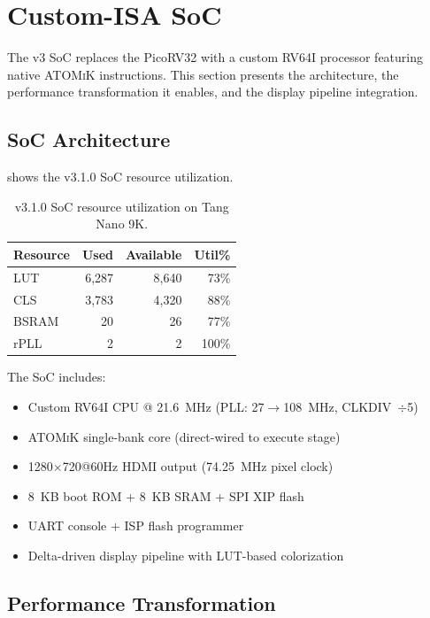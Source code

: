 \documentclass[11pt,letterpaper]{article}
\theoremstyle{plain}
\theoremstyle{definition}
\theoremstyle{remark}
\newcommand{\atomik}{\textsc{ATOMiK}}
\begin{document}
\section{Custom-ISA SoC}
\label{sec:v3}

The v3 SoC replaces the PicoRV32 with a custom RV64I processor featuring native \atomik{} instructions. This section presents the architecture, the performance transformation it enables, and the display pipeline integration.

\subsection{SoC Architecture}

 shows the v3.1.0 SoC resource utilization.

\begin{table}[!htbp]
\centering
\caption{v3.1.0 SoC resource utilization on Tang Nano 9K.}
\label{tab:v3-resources}
\begin{tabular}{@{}lrrr@{}}
\toprule
\textbf{Resource} & \textbf{Used} & \textbf{Available} & \textbf{Util\%} \\
\midrule
LUT    & 6,287 & 8,640  & 73\% \\
CLS    & 3,783 & 4,320  & 88\% \\
BSRAM  & 20    & 26     & 77\% \\
rPLL   & 2     & 2      & 100\% \\
\bottomrule
\end{tabular}
\end{table}

The SoC includes:
\begin{itemize}
    \item Custom RV64I CPU @ 21.6~MHz (PLL: 27$\rightarrow$108~MHz, CLKDIV~$\div$5)
    \item \atomik{} single-bank core (direct-wired to execute stage)
    \item 1280$\times$720@60Hz HDMI output (74.25~MHz pixel clock)
    \item 8~KB boot ROM + 8~KB SRAM + SPI XIP flash
    \item UART console + ISP flash programmer
    \item Delta-driven display pipeline with LUT-based colorization
\end{itemize}

\subsection{Performance Transformation}
\end{document}
